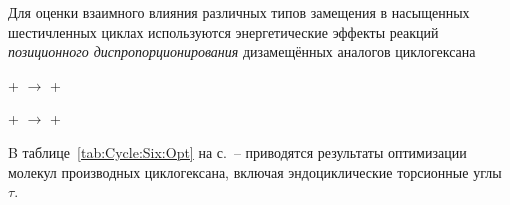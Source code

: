 Для оценки взаимного влияния различных типов замещения в насыщенных шестичленных циклах используются энергетические эффекты реакций \emph{позиционного диспропорционирования} дизамещённых аналогов циклогексана
\begin{center}
   +  \(\longrightarrow\)  + 

   +  \(\longrightarrow\)  + 
\end{center}

B таблице~\ref{tab:Cycle:Six:Opt} на с.~\pageref{tab:Cycle:Six:Opt}--\pageref{tab:Cycle:Six:Opt:Ends} приводятся результаты оптимизации молекул производных циклогексана, включая эндоциклические торсионные углы $\tau$.

\begin{center}
   \quad{} \quad{} \quad{} \quad{}
\end{center}

